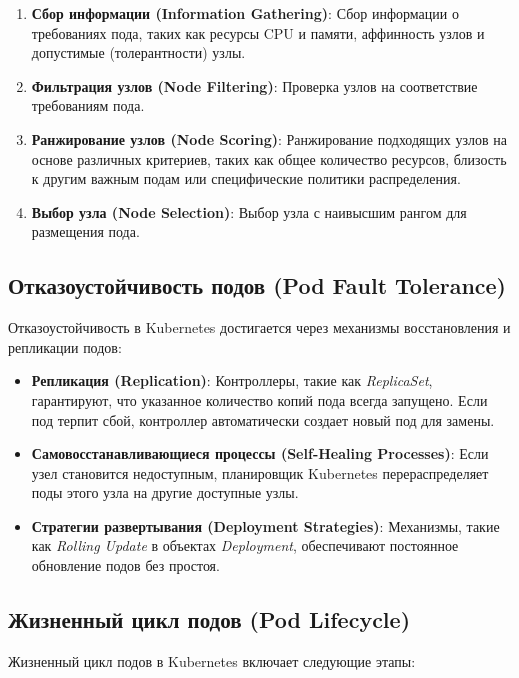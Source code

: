 \begin{enumerate}
   \item \textbf{Сбор информации (Information Gathering)}: Сбор информации о
требованиях пода, таких как ресурсы CPU и памяти, аффинность узлов и
допустимые (толерантности) узлы.
   \item \textbf{Фильтрация узлов (Node Filtering)}: Проверка узлов на
соответствие
требованиям пода.
   \item \textbf{Ранжирование узлов (Node Scoring)}: Ранжирование подходящих
узлов
на основе различных критериев, таких как общее количество ресурсов, близость к
другим важным подам или специфические политики распределения.
   \item \textbf{Выбор узла (Node Selection)}: Выбор узла с наивысшим рангом
для размещения пода.
\end{enumerate}

\subsection*{Отказоустойчивость подов (Pod Fault Tolerance)}

Отказоустойчивость в Kubernetes достигается через механизмы восстановления и
репликации подов:

\begin{itemize}
   \item \textbf{Репликация (Replication)}: Контроллеры, такие как
\textit{ReplicaSet}, гарантируют, что указанное количество копий пода всегда
запущено. Если под терпит сбой, контроллер автоматически создает новый под для
замены.
   \item \textbf{Самовосстанавливающиеся процессы (Self-Healing Processes)}:
Если узел
становится недоступным, планировщик Kubernetes перераспределяет поды этого узла
на другие доступные узлы.
   \item \textbf{Стратегии развертывания (Deployment Strategies)}: Механизмы,
такие как \textit{Rolling Update} в объектах \textit{Deployment}, обеспечивают
постоянное обновление подов без простоя.
\end{itemize}

\subsection*{Жизненный цикл подов (Pod Lifecycle)}

Жизненный цикл подов в Kubernetes включает следующие этапы:

